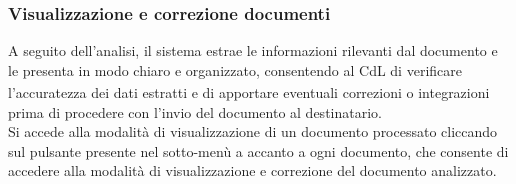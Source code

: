 \documentclass[a4paper,11pt]{article}
\newcommand{\G}{\textsubscript{\scalebox{0.6}{\textbf{G}}}}
\begin{document}
\subsubsection{Visualizzazione e correzione documenti}
A seguito dell'analisi, il sistema estrae le informazioni rilevanti dal documento e le presenta in modo chiaro e organizzato, consentendo al CdL\G{} di verificare l'accuratezza dei dati estratti e di apportare eventuali correzioni o integrazioni prima di procedere con l'invio del documento al destinatario.\\
Si accede alla modalità di visualizzazione di un documento processato cliccando sul pulsante  presente nel sotto-menù a  accanto a ogni documento, che consente di accedere alla modalità di visualizzazione e correzione del documento analizzato.\\ 
\end{document}
